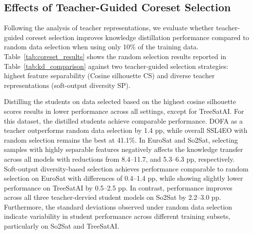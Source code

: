 \documentclass[conference]{IEEEtran}
\begin{document}
\subsection{Effects of Teacher-Guided Coreset Selection}

Following the analysis of teacher representations, we evaluate whether teacher-guided coreset selection improves knowledge distillation performance compared to random data selection when using only 10\% of the training data.
Table~\ref{tab:coreset_results} shows the random selection results reported in Table~\ref{tab:kd_comparison} against two teacher-guided selection strategies: highest feature separability (Cosine silhouette CS) and diverse teacher representations (soft-output diversity SP).

Distilling the students on data selected based on the highest cosine silhouette scores results in lower performance across all settings, except for TreeSatAI.
For this dataset, the distilled students achieve comparable performance.
DOFA as a teacher outperforms random data selection by 1.4 pp, while overall SSL4EO with random selection remains the best at 41.1\%.
In EuroSat and So2Sat, selecting samples with highly separable features negatively affects the knowledge transfer across all models with reductions from 8.4--11.7, and 5.3--6.3 pp, respectively.
Soft-output diversity-based selection achieves performance comparable to random selection on EuroSat with differences of 0.4--1.4 pp, while showing slightly lower performance on TreeSatAI by 0.5--2.5 pp.
In contrast, performance improves across all three teacher-dervied student models on So2Sat by 2.2--3.0 pp.
Furthermore, the standard deviations observed under random data selection indicate variability in student performance across different training subsets, particularly on So2Sat and TreeSatAI.


\newcommand{\acc}[1]{\meanval{#1}}
\end{document}
